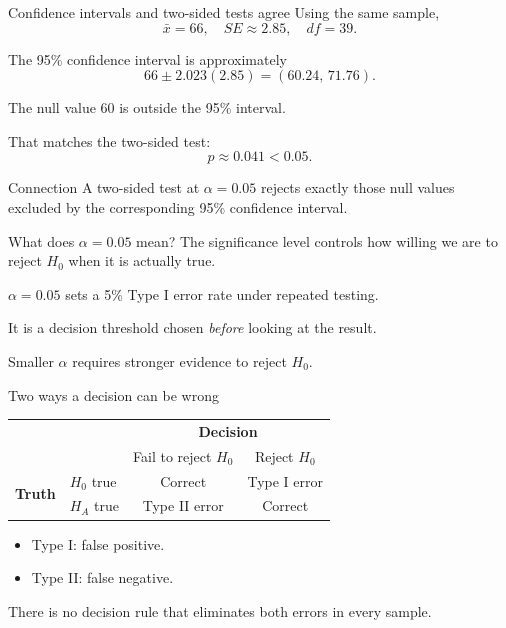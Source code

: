 \documentclass[11pt,aspectratio=169]{beamer}
\begin{document}
\begin{frame}{Confidence intervals and two-sided tests agree}
\small
Using the same sample,
\[
\bar{x}=66,\quad SE\approx2.85,\quad df=39.
\]

The 95\% confidence interval is approximately
\[
66\pm2.023(2.85)
=(60.24,\,71.76).
\]

The null value 60 is \alert{outside} the 95\% interval.

\vspace{0.35em}
That matches the two-sided test:
\[
p\approx0.041<0.05.
\]

\begin{block}{Connection}
A two-sided test at $\alpha=0.05$ rejects exactly those null values excluded by the corresponding 95\% confidence interval.
\end{block}
\end{frame}

\begin{frame}{What does $\alpha=0.05$ mean?}
The significance level controls how willing we are to reject $H_0$ when it is actually true.

\begin{center}
\Large $\alpha=0.05$ sets a \alert{5\% Type I error rate} under repeated testing.
\end{center}

\vspace{0.8em}
It is a decision threshold chosen \emph{before} looking at the result.

\vfill
Smaller $\alpha$ requires stronger evidence to reject $H_0$.
\end{frame}

\begin{frame}{Two ways a decision can be wrong}
\begin{center}
\begin{tabular}{llcc}
\toprule
& & \multicolumn{2}{c}{\textbf{Decision}}\\
& & Fail to reject $H_0$ & Reject $H_0$\\
\midrule
\multirow{2}{*}{\textbf{Truth}} & $H_0$ true & Correct & \alert{Type I error}\\
& $H_A$ true & \alert{Type II error} & Correct\\
\bottomrule
\end{tabular}
\end{center}

\vspace{1em}
\begin{itemize}
  \item Type I: false positive.
  \item Type II: false negative.
\end{itemize}

\vfill
There is no decision rule that eliminates both errors in every sample.
\end{frame}
\end{document}
